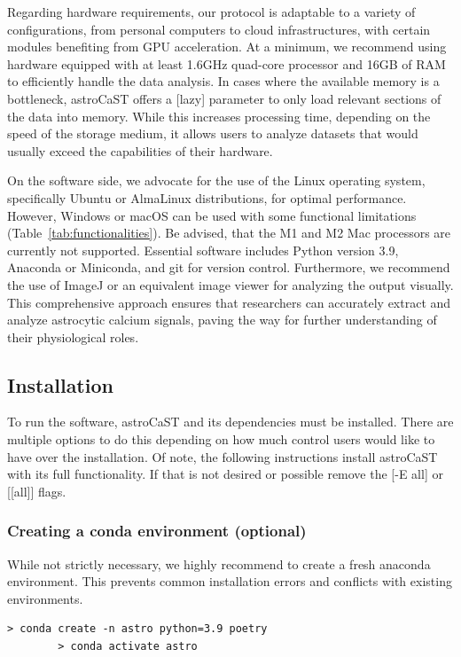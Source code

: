 \documentclass[utf8]{FrontiersinHarvard}
\newcommand{\inlineBash}[1]{%
    \begingroup
    \edef\temp{#1}%
    \expandafter\StrSubstitute\expandafter{\temp}{--}{-{-}}[\temp]%
    \tcbox[on line, boxsep=0pt, left=1pt, right=1pt, top=1pt, bottom=1pt,
        boxrule=0pt, arc=0pt, outer arc=0pt, colback=lightgray]{
        \texttt{\small \temp}
    }%
    \endgroup
}
\newcommand{\inlinepy}[1]{\inlineBash{#1}}
\newcommand{\tref}[1]{ (Table~\ref{tab:#1})}
\begin{document}
    Regarding hardware requirements, our protocol is adaptable to a variety of configurations, from personal computers to cloud infrastructures, with certain modules benefiting from \ac{GPU} acceleration. At a minimum, we recommend using hardware equipped with at least 1.6GHz quad-core processor and 16GB of RAM to efficiently handle the data analysis. In cases where the available memory is a bottleneck, astroCaST offers a \inlinepy{lazy} parameter to only load relevant sections of the data into memory. While this increases processing time, depending on the speed of the storage medium, it allows users to analyze datasets that would usually exceed the capabilities of their hardware.

    On the software side, we advocate for the use of the Linux operating system, specifically Ubuntu or AlmaLinux distributions, for optimal performance. However, Windows or macOS can be used with some functional limitations\tref{functionalities}. Be advised, that the M1 and M2 Mac processors are currently not supported. Essential software includes Python version 3.9, Anaconda or Miniconda, and git for version control. Furthermore, we recommend the use of ImageJ or an equivalent image viewer for analyzing the output visually. This comprehensive approach ensures that researchers can accurately extract and analyze astrocytic calcium signals, paving the way for further understanding of their physiological roles.

    \subsection{Installation}
    To run the software, astroCaST and its dependencies must be installed. There are multiple options to do this depending on how much control users would like to have over the installation. Of note, the following instructions install astroCaST with its full functionality. If that is not desired or possible remove the \inlineBash{-E all} or \inlineBash{[all]} flags.

    \subsubsection{Creating a conda environment (optional)}
    While not strictly necessary, we highly recommend to create a fresh anaconda environment. This
    prevents common installation errors and conflicts with existing environments.

    \begin{lstlisting}[style=bashStyle]
        > conda create -n astro python=3.9 poetry
        > conda activate astro
    \end{lstlisting}
\end{document}
